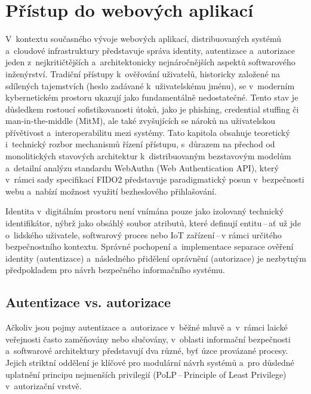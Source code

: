\chapter{Přístup do webových aplikací}
\label{ch:access}
V~kontextu současného vývoje webových aplikací, distribuovaných systémů a~cloudové infrastruktury představuje správa identity, autentizace a~autorizace jeden z~nejkritičtějších a~architektonicky nejnáročnějších aspektů softwarového inženýrství.
Tradiční přístupy k~ověřování uživatelů, historicky založené na sdílených tajemstvích (heslo zadávané k~uživatelskému jménu), se v~moderním kybernetickém prostoru ukazují jako fundamentálně nedostatečné.
Tento stav je důsledkem rostoucí sofistikovanosti útoků, jako je phishing, credential stuffing či man-in-the-middle (MitM), ale také zvyšujících se nároků na uživatelskou přívětivost a~interoperabilitu mezi systémy.
Tato kapitola obsahuje teoretický i~technický rozbor mechanismů řízení přístupu, s~důrazem na přechod od monolitických stavových architektur k~distribuovaným bezstavovým modelům a~detailní analýzu standardu WebAuthn (Web Authentication API), který v~rámci sady specifikací FIDO2 představuje paradigmatický posun v~bezpečnosti webu a~nabízí možnost využití bezheslového přihlašování.

Identita v~digitálním prostoru není vnímána pouze jako izolovaný technický identifikátor, nýbrž jako obsáhlý soubor atributů, které definují entitu\,--\,ať už jde o~lidského uživatele, softwarový proces nebo IoT zařízení\,--\,v rámci určitého bezpečnostního kontextu.
Správné pochopení a~implementace separace ověření identity (autentizace) a~následného přidělení oprávnění (autorizace) je nezbytným předpokladem pro návrh bezpečného informačního systému.

\section{Autentizace vs. autorizace}
Ačkoliv jsou pojmy autentizace a~autorizace v~běžné mluvě a~v~rámci laické veřejnosti často zaměňovány nebo slučovány, v~oblasti informační bezpečnosti a~softwarové architektury představují dva různé, byť úzce provázané procesy.
Jejich striktní oddělení je klíčové pro modulární návrh systémů a~pro důsledné uplatnění principu nejmenších privilegií (PoLP\,--\,Principle of Least Privilege) v~autorizační vrstvě.

